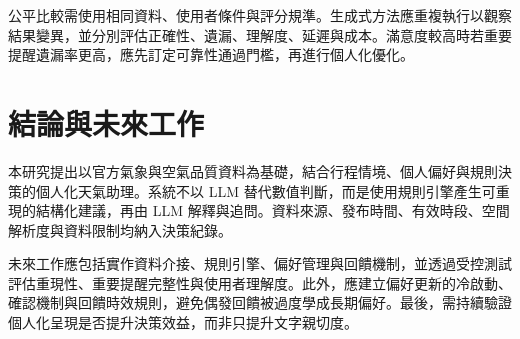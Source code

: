 \documentclass[conference]{IEEEtran}
\begin{document}
公平比較需使用相同資料、使用者條件與評分規準。生成式方法應重複執行以觀察結果變異，並分別評估正確性、遺漏、理解度、延遲與成本。滿意度較高時若重要提醒遺漏率更高，應先訂定可靠性通過門檻，再進行個人化優化。

\section{結論與未來工作}
本研究提出以官方氣象與空氣品質資料為基礎，結合行程情境、個人偏好與規則決策的個人化天氣助理。系統不以 LLM 替代數值判斷，而是使用規則引擎產生可重現的結構化建議，再由 LLM 解釋與追問。資料來源、發布時間、有效時段、空間解析度與資料限制均納入決策紀錄。

未來工作應包括實作資料介接、規則引擎、偏好管理與回饋機制，並透過受控測試評估重現性、重要提醒完整性與使用者理解度。此外，應建立偏好更新的冷啟動、確認機制與回饋時效規則，避免偶發回饋被過度學成長期偏好。最後，需持續驗證個人化呈現是否提升決策效益，而非只提升文字親切度。
\end{document}
